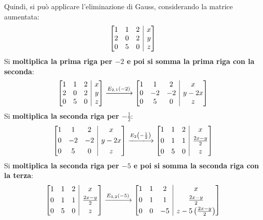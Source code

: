 \documentclass[a4paper]{article}
\makeatletter
\newenvironment{rowequmatbra}[1]{\left[\array{@{}#1@{}}}{\endarray\right]}
\makeatother
\begin{document}
	Quindi, si può applicare l'eliminazione di Gauss, considerando la matrice aumentata:
	\begin{equation*}
		\begin{rowequmatbra}{ccc|c}
			1 & 1 & 2 & x \\
			2 & 0 & 2 & y \\
			0 & 5 & 0 & z
		\end{rowequmatbra}
	\end{equation*}
	Si \textbf{moltiplica la prima riga per $-2$ e poi si somma la prima riga con la seconda}:
	\begin{equation*}
		\begin{rowequmatbra}{ccc|c}
			1 & 1 & 2 & x \\
			2 & 0 & 2 & y \\
			0 & 5 & 0 & z
		\end{rowequmatbra}
		\xlongrightarrow{E_{2,1}\left(-2\right)}
		\begin{rowequmatbra}{ccc|c}
			1 & 1 & 2 & x \\
			0 & -2 & -2 & y-2x \\
			0 & 5 & 0 & z
		\end{rowequmatbra}
	\end{equation*}
	Si \textbf{moltiplica la seconda riga per $-\frac{1}{2}$}:
	\begin{equation*}
		\begin{rowequmatbra}{ccc|c}
			1 & 1 & 2 & x \\ [0.3em]
			0 & -2 & -2 & y-2x \\ [0.3em]
			0 & 5 & 0 & z
		\end{rowequmatbra}
		\xlongrightarrow{E_{2}\left(-\frac{1}{2}\right)}
		\begin{rowequmatbra}{ccc|c}
			1 & 1 & 2 & x \\ [0.3em]
			0 & 1 & 1 & \frac{2x-y}{2} \\ [0.3em]
			0 & 5 & 0 & z
		\end{rowequmatbra}
	\end{equation*}
	Si \textbf{moltiplica la seconda riga per $-5$ e poi si somma la seconda riga con la terza}:
	\begin{equation*}
		\begin{rowequmatbra}{ccc|c}
			1 & 1 & 2 & x \\ [0.3em]
			0 & 1 & 1 & \frac{2x-y}{2} \\ [0.3em]
			0 & 5 & 0 & z
		\end{rowequmatbra}
		\xlongrightarrow{E_{3,2}\left(-5\right)}
		\begin{rowequmatbra}{ccc|c}
			1 & 1 & 2 & x \\ [0.3em]
			0 & 1 & 1 & \frac{2x-y}{2} \\ [0.3em]
			0 & 0 & -5 & z-5\left(\frac{2x-y}{2}\right)
		\end{rowequmatbra}
	\end{equation*}
\end{document}
